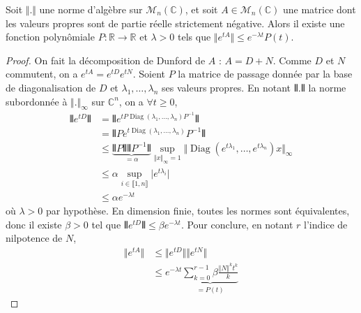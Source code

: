 





  \begin{lemma}
    \label{equation-de-sylvester-1}
    Soit $\Vert . \Vert$ une norme d'algèbre sur $\mathcal{M}_n(\mathbb{C})$, et soit $A \in \mathcal{M}_n(\mathbb{C})$ une matrice dont les valeurs propres sont de partie réelle strictement négative. Alors il existe une fonction polynômiale $P : \mathbb{R} \rightarrow \mathbb{R}$ et $\lambda > 0$ tels que $\Vert e^{tA} \Vert \leq e^{- \lambda t} P(t)$.
  \end{lemma}

  \begin{proof}
    On fait la décomposition de Dunford de $A$ : $A = D+N$. Comme $D$ et $N$ commutent, on a $e^{tA} = e^{tD} e^{tN}$. Soient $P$ la matrice de passage donnée par la base de diagonalisation de $D$ et $\lambda_1, \dots, \lambda_n$ ses valeurs propres. En notant $\VERT . \VERT$ la norme subordonnée à $\Vert . \Vert_\infty$ sur $\mathbb{C}^n$, on a $\forall t \geq 0$,
    \begin{align*}
      \VERT e^{tD} \VERT &= \VERT e^{tP \operatorname{Diag}(\lambda_1, \dots, \lambda_n) P^{-1}} \VERT \\
      & = \VERT P e^{t \operatorname{Diag}(\lambda_1, \dots, \lambda_n)} P^{-1} \VERT \\
      & \leq \underbrace{\VERT P \VERT \VERT P^{-1} \VERT}_{= \alpha} \sup_{\Vert x \Vert_\infty = 1} \Vert \operatorname{Diag}(e^{t \lambda_1}, \dots, e^{t \lambda_n}) x \Vert_{\infty} \\
      & \leq \alpha \sup_{i \in \llbracket 1, n \rrbracket} \vert e^{t\lambda_i} \vert \\
      & \leq \alpha e^{-\lambda t}
    \end{align*}
    où $\lambda > 0$ par hypothèse. En dimension finie, toutes les normes sont équivalentes, donc il existe $\beta > 0$ tel que $\VERT e^{tD} \VERT \leq \beta e^{- \lambda t}$.
    \newpar
    Pour conclure, en notant $r$ l'indice de nilpotence de $N$,
    \begin{align*}
      \Vert e^{tA} \Vert & \leq \Vert e^{tD} \Vert \Vert e^{tN} \Vert \\
      & \leq e^{- \lambda t} \underbrace{\sum_{k=0}^{r-1} \beta \frac{\Vert N \Vert^k t^k}{k}}_{= P(t)}
    \end{align*}
  \end{proof}

